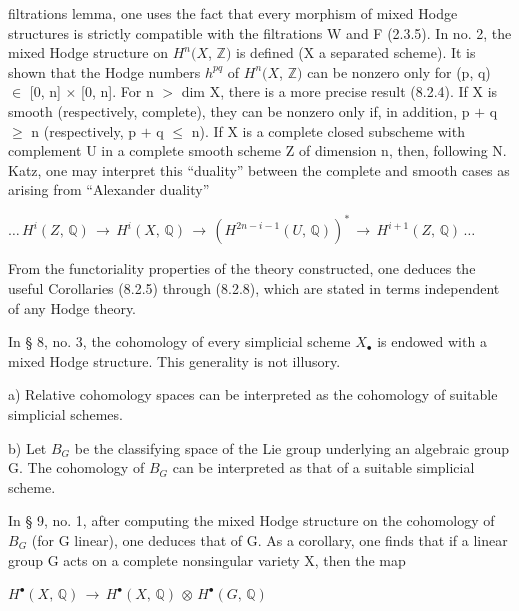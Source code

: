\documentclass[11pt,twoside]{article}
\newcommand{\DFormula}[1]{%
  \par\smallskip\noindent\hspace*{0pt}\(\displaystyle #1\)\par\smallskip
}
\begin{document}
filtrations lemma, one uses the fact that every morphism of mixed Hodge structures is strictly compatible with the filtrations W and F (2.3.5). In no. 2, the mixed Hodge structure on \(H^{n}(X\), \(\mathbb{Z})\) is defined (X a separated scheme). It is shown that the Hodge numbers \(h^{pq}\) of \(H^{n}(X\), \(\mathbb{Z})\) can be nonzero only for (p, q) \(\in \) [0, n] \(\times \) [0, n]. For n \(>\) dim X, there is a more precise result (8.2.4). If X is smooth (respectively, complete), they can be nonzero only if, in addition, p \(+\) q \(\geq \) n (respectively, p \(+\) q \(\leq \) n). If X is a complete closed subscheme with complement U in a complete smooth scheme Z of dimension n, then, following N. Katz, one may interpret this “duality” between the complete and smooth cases as arising from “Alexander duality”\par
\par\medskip
\DFormula{…\,H^{i}(Z,\,\mathbb{Q})\,\to \,H^{i}(X,\,\mathbb{Q})\,\to \,(H^{2n−i−1}(U,\,\mathbb{Q}))^{\ast }\,\to \,H^{i+1}(Z,\,\mathbb{Q})\,…}
\par\medskip
From the functoriality properties of the theory constructed, one deduces the useful Corollaries (8.2.5) through (8.2.8), which are stated in terms independent of any Hodge theory.\par
\par\medskip
In § 8, no. 3, the cohomology of every simplicial scheme \(X_{\bullet }\) is endowed with a mixed Hodge structure. This generality is not illusory.\par
\par\medskip
a) Relative cohomology spaces can be interpreted as the cohomology of suitable simplicial schemes.\par
\par\medskip
b) Let \(B_{G}\) be the classifying space of the Lie group underlying an algebraic group G. The cohomology of \(B_{G}\) can be interpreted as that of a suitable simplicial scheme.\par
\par\medskip
In § 9, no. 1, after computing the mixed Hodge structure on the cohomology of \(B_{G}\) (for G linear), one deduces that of G. As a corollary, one finds that if a linear group G acts on a complete nonsingular variety X, then the map\par
\par\medskip
\DFormula{H^{\bullet }(X,\,\mathbb{Q})\,\to \,H^{\bullet }(X,\,\mathbb{Q})\,\otimes \,H^{\bullet }(G,\,\mathbb{Q})}
\par\medskip
\end{document}
